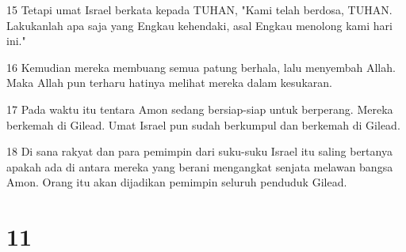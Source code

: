 \par 15 Tetapi umat Israel berkata kepada TUHAN, "Kami telah berdosa, TUHAN. Lakukanlah apa saja yang Engkau kehendaki, asal Engkau menolong kami hari ini."
\par 16 Kemudian mereka membuang semua patung berhala, lalu menyembah Allah. Maka Allah pun terharu hatinya melihat mereka dalam kesukaran.
\par 17 Pada waktu itu tentara Amon sedang bersiap-siap untuk berperang. Mereka berkemah di Gilead. Umat Israel pun sudah berkumpul dan berkemah di Gilead.
\par 18 Di sana rakyat dan para pemimpin dari suku-suku Israel itu saling bertanya apakah ada di antara mereka yang berani mengangkat senjata melawan bangsa Amon. Orang itu akan dijadikan pemimpin seluruh penduduk Gilead.

\chapter{11}

